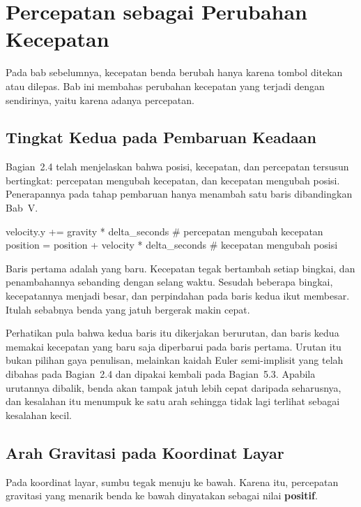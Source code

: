 \section{Percepatan sebagai Perubahan Kecepatan}
\label{sec:percepatan}

Pada bab sebelumnya, kecepatan benda berubah hanya karena tombol ditekan atau
dilepas. Bab ini membahas perubahan kecepatan yang terjadi dengan sendirinya,
yaitu karena adanya percepatan.

\subsection{Tingkat Kedua pada Pembaruan Keadaan}

Bagian~2.4 telah menjelaskan bahwa posisi, kecepatan, dan percepatan tersusun
bertingkat: percepatan mengubah kecepatan, dan kecepatan mengubah posisi.
Penerapannya pada tahap pembaruan hanya menambah satu baris dibandingkan
Bab~V.

\begin{kodekeluaran}
velocity.y += gravity * delta_seconds      # percepatan mengubah kecepatan
position = position + velocity * delta_seconds   # kecepatan mengubah posisi
\end{kodekeluaran}

Baris pertama adalah yang baru. Kecepatan tegak bertambah
setiap bingkai, dan penambahannya sebanding dengan selang waktu. Sesudah
beberapa bingkai, kecepatannya menjadi besar, dan perpindahan pada baris kedua
ikut membesar. Itulah sebabnya benda yang jatuh bergerak makin cepat.

Perhatikan pula bahwa kedua baris itu dikerjakan berurutan, dan baris kedua
memakai kecepatan yang baru saja diperbarui pada baris pertama. Urutan itu
bukan pilihan gaya penulisan, melainkan kaidah Euler semi-implisit yang telah
dibahas pada Bagian~2.4 dan dipakai kembali pada Bagian~5.3. Apabila urutannya
dibalik, benda akan tampak jatuh lebih cepat daripada seharusnya, dan
kesalahan itu menumpuk ke satu arah sehingga tidak lagi terlihat sebagai
kesalahan kecil.

\subsection{Arah Gravitasi pada Koordinat Layar}

Pada koordinat layar, sumbu tegak menuju ke bawah. Karena itu, percepatan
gravitasi yang menarik benda ke bawah dinyatakan sebagai nilai
\textbf{positif}.


